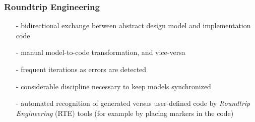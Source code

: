%
%
%
%
%
%
%

\subsubsection{Roundtrip Engineering}
\label{roundtrip_engineering_heading}

\begin{itemize}
    \item[-] bidirectional exchange between abstract design model and
        implementation code
    \item[-] manual model-to-code transformation, and vice-versa
    \item[-] frequent iterations as errors are detected
    \item[-] considerable discipline necessary to keep models synchronized
    \item[-] automated recognition of generated versus user-defined code by
        \emph{Roundtrip Engineering} (RTE) tools (for example by placing markers
        in the code)
\end{itemize}
